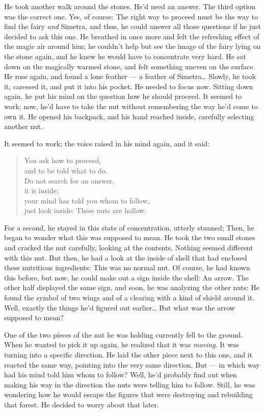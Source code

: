 He took another walk around the stones. He'd need an answer. The third option was the correct one. Yes, of course: The right way to proceed must be the way to find the fairy \emph{and} Simetra, and thus, he could answer all those questions if he just decided to ask this one. 
He breathed in once more and felt the refreshing effect of the magic air around him; he couldn't help but see the image of the fairy lying on the stone again, and he knew he would have to concentrate very hard. He sat down on the magically warmed stone, and felt something uneven on the surface. He rose again, and found a lone feather --- a feather of Simetra\dots{}
Slowly, he took it, caressed it, and put it into his pocket. He needed to focus now. Sitting down again, he put his mind on the question how he should proceed. It seemed to work; now, he'd have to take the nut without remembering the way he'd come to own it. He opened his backpack, and his hand reached inside, carefully selecting another nut.

It seemed to work; the voice raised in his mind again, and it said: 
\begin{quote}
You ask how to proceed,\\
and to be told what to do.\\
Do not search for an answer,\\
it is inside;\\
your mind has told you whom to follow,\\
just look inside: These nuts are hollow.
\end{quote}
For a second, he stayed in this state of concentration, utterly stunned; Then, he began to wonder what this was supposed to mean. He took the two small stones and cracked the nut carefully, looking at the contents. Nothing seemed different with this nut. But then, he had a look at the inside of shell that had enclosed these nutritious ingredients: This was no normal nut.
Of course, he had known this before, but now, he could make out a sign inside the shell: An arrow. The other half displayed the same sign, and soon, he was analyzing the other nuts: He found the symbol of two wings and of a clearing with a kind of shield around it. Well, exactly the things he'd figured out earlier\dots{}
But what was the arrow supposed to mean? 

One of the two pieces of the nut he was holding currently fell to the ground. When he wanted to pick it up again, he realized that it was \emph{moving}. It was turning into a specific direction. He laid the other piece next to this one, and it reacted the same way, pointing into the very same direction. But --- in which way had his mind told him whom to follow? 
Well, he'd probably find out when making his way in the direction the nuts were telling him to follow. Still, he was wondering how he would escape the figures that were destroying and rebuilding that forest. He decided to worry about that later.

